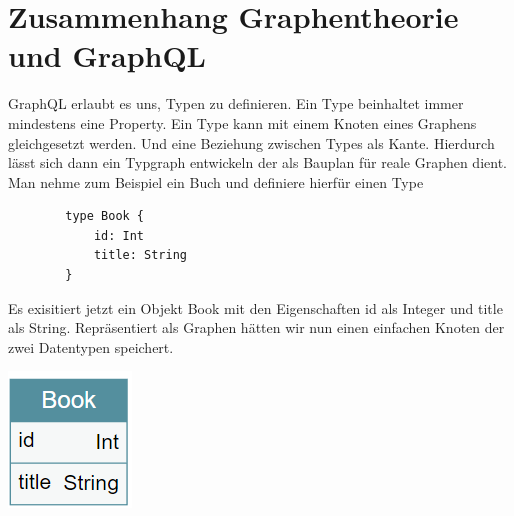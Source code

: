 \section{Zusammenhang Graphentheorie und GraphQL}

GraphQL erlaubt es uns, Typen zu definieren. Ein Type beinhaltet immer mindestens eine Property. Ein Type kann mit einem
Knoten eines Graphens gleichgesetzt werden. Und eine Beziehung zwischen Types als Kante. Hierdurch lässt sich dann
ein Typgraph entwickeln der als Bauplan für reale Graphen dient.
Man nehme zum Beispiel ein Buch und definiere hierfür einen Type

\begin{center}
    \begin{verbatim}
        type Book {
            id: Int
            title: String
        }
    \end{verbatim}
\end{center}

Es exisitiert jetzt ein Objekt Book mit den Eigenschaften id als Integer und title als String.
Repräsentiert als Graphen hätten wir nun einen einfachen Knoten der zwei Datentypen speichert.

\begin{center}
    \includegraphics[width=\textwidth,height=\textheight,keepaspectratio]{img/book}
\end{center}


